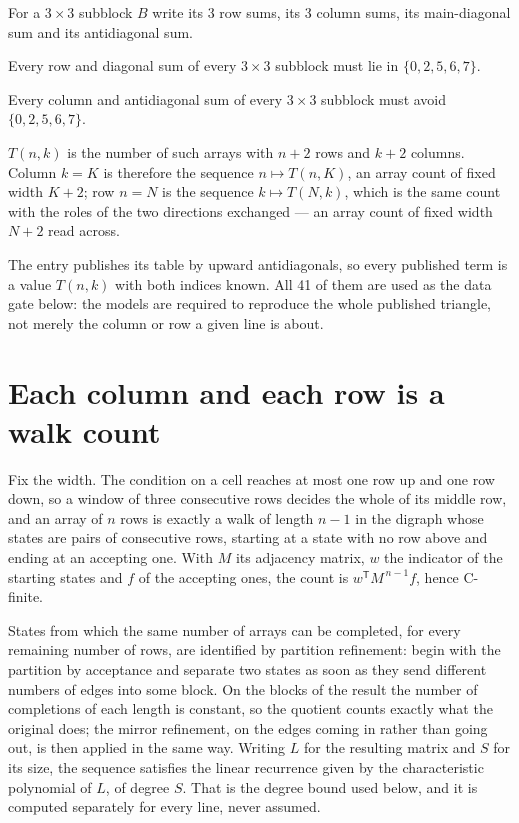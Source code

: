 \documentclass[11pt]{article}
\theoremstyle{definition}
\begin{document}
For a $3\times3$ subblock $B$ write its 3 row sums, its 3 column sums, its main-diagonal sum and its antidiagonal sum.

Every row and diagonal sum of every $3\times3$ subblock must lie in $\{0, 2, 5, 6, 7\}$.

Every column and antidiagonal sum of every $3\times3$ subblock must avoid $\{0, 2, 5, 6, 7\}$.

$T(n,k)$ is the number of such arrays with $n + 2$ rows and $k + 2$ columns. Column $k = K$ is therefore the sequence $n \mapsto T(n,K)$, an array count of fixed width $K + 2$; row $n = N$ is the sequence $k \mapsto T(N,k)$, which is the same count with the roles of the two directions exchanged --- an array count of fixed width $N + 2$ read across.

The entry publishes its table by upward antidiagonals, so every published term is a value $T(n,k)$ with both indices known. All 41 of them are used as the data gate below: the models are required to reproduce the whole published triangle, not merely the column or row a given line is about.

\section{Each column and each row is a walk count}

Fix the width. The condition on a cell reaches at most one row up and one row down, so a window of three consecutive rows decides the whole of its middle row, and an array of $n$ rows is exactly a walk of length $n-1$ in the digraph whose states are pairs of consecutive rows, starting at a state with no row above and ending at an accepting one. With $M$ its adjacency matrix, $w$ the indicator of the starting states and $f$ of the accepting ones, the count is $w^{\mathsf T}M^{\,n-1}f$, hence C-finite.

States from which the same number of arrays can be completed, for every remaining number of rows, are identified by partition refinement: begin with the partition by acceptance and separate two states as soon as they send different numbers of edges into some block. On the blocks of the result the number of completions of each length is constant, so the quotient counts exactly what the original does; the mirror refinement, on the edges coming in rather than going out, is then applied in the same way. Writing $L$ for the resulting matrix and $S$ for its size, the sequence satisfies the linear recurrence given by the characteristic polynomial of $L$, of degree $S$. That is the degree bound used below, and it is computed separately for every line, never assumed.
\end{document}
